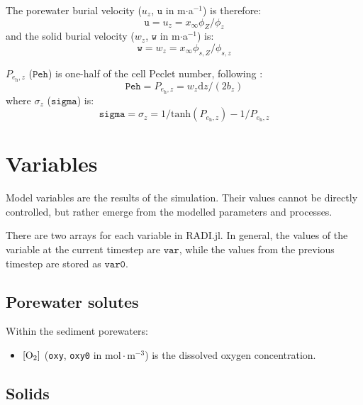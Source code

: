 \documentclass[a4paper]{article}
\newcommand{\D}[1]{\mathrm{d}#1}
\newcommand{\code}[1]{\texttt{#1}}
\newcommand{\molmmm}{\mathrm{mol}\cdot\mathrm{m}^{-3}}
\begin{document}
The porewater burial velocity ($u_z$, $\code{u}$ in m$\cdot$a$^{-1}$) is therefore:
\begin{equation}
\code{u} = u_z = x_\infty \phi_Z / \phi_z
\end{equation}
and the solid burial velocity ($w_z$, $\code{w}$ in m$\cdot$a$^{-1}$) is:
\begin{equation}
\code{w} = w_z = x_\infty \phi_{s,Z} / \phi_{s,z}
\end{equation}

$P_{e_\mathrm{h}, z}$ ($\code{Peh}$) is one-half of the cell Peclet number, following \citet{boudreau_method_1996}:
\begin{equation}
\code{Peh} = P_{e_\mathrm{h}, z} = w_z \D{z} / (2 b_z)
\end{equation}
where $\sigma_z$ ($\code{sigma}$) is:
\begin{equation}
\code{sigma} = \sigma_z = 1 / \mathrm{tanh}(P_{e_\mathrm{h}, z}) - 1 / P_{e_\mathrm{h}, z}
\end{equation}



\section{Variables}

Model variables are the results of the simulation.  Their values cannot be directly controlled, but rather emerge from the modelled parameters and processes.

There are two arrays for each variable in RADI.jl. In general, the values of the variable at the current timestep are $\code{var}$, while the values from the previous timestep are stored as $\code{var0}$.


\subsection{Porewater solutes}

Within the sediment porewaters:
\begin{itemize}
  \item $[\ce{O2}]$ (\code{oxy}, \code{oxy0} in $\molmmm$) is the dissolved oxygen concentration.
\end{itemize}


\subsection{Solids}
\end{document}
